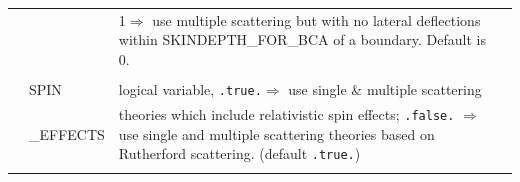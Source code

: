 \begin{table}[htb]
\begin{center}
\begin{tabular}{ l  l   p{105mm}l  |}
        &            &  1$\Rightarrow$ use multiple scattering but with
                  no lateral deflections within SKINDEPTH\_FOR\_BCA of a
                  boundary.  Default is  0.\\
    &&\\
      	&SPIN &logical variable, {\tt .true.}$\Rightarrow$ use single \&
                multiple scattering\\
	&\_EFFECTS	& theories which include relativistic spin
               effects; {\tt .false.}
		$\Rightarrow$ use single and multiple scattering theories
                based on Rutherford scattering. (default {\tt .true.})\\
	&&\\
   \hline
   \end{tabular}
   \end{center}
\end{table}

\clearpage

